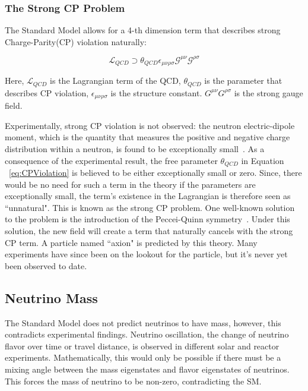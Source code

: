 \subsubsection{The Strong CP Problem}
\label{sec:strongcp}
The Standard Model allows for a 4-th dimension term that describes strong Charge-Parity(CP) violation naturally:

\begin{equation}
    \mathcal{L}_{QCD} \supset \theta_{QCD}\epsilon_{\mu\nu\rho\sigma} \mathcal{G}^{\mu\nu}\mathcal{G}^{\rho\sigma}
    \label{eq:CPViolation}
\end{equation}

Here, $\mathcal{L}_{QCD}$ is the Lagrangian term of the QCD, $\theta_{QCD}
$ is the parameter that describes CP violation,  $\epsilon_{\mu\nu\rho\sigma}$ is the structure constant. $G^{\mu\nu}G^{\rho\sigma}$ is the strong gauge field.

Experimentally, strong CP violation is not observed: the neutron electric-dipole moment, which is the quantity that measures the positive and negative charge distribution within a neutron, is found to be exceptionally small~\cite{PhysRevLett.124.081803}. As a consequence of the experimental result, the free parameter $\theta_{QCD}$ in Equation ~\ref{eq:CPViolation} is believed to be either exceptionally small or zero. Since, there would be no need for such a term in the theory if the
parameters are exceptionally small, the term's existence in the Lagrangian is therefore seen as ``unnatural". This is known as the strong CP problem.
One well-known solution to the problem is the introduction of the Peccei-Quinn symmetry~\cite{PQSym}. Under this solution, the new field will create a term that naturally cancels with the strong CP term. A particle named ``axion" is predicted by this theory. Many experiments have since been on the lookout for the particle, but it's never yet been observed to date.

\subsection{Neutrino Mass}
The Standard Model does not predict neutrinos to have mass, however, this contradicts experimental findings. Neutrino oscillation, the change of neutrino flavor over time or travel distance, is observed in different solar and reactor experiments. Mathematically, this would only be possible if there must be a mixing angle between the mass eigenstates and flavor eigenstates of neutrinos. This forces the mass of neutrino to be non-zero, contradicting the SM.

